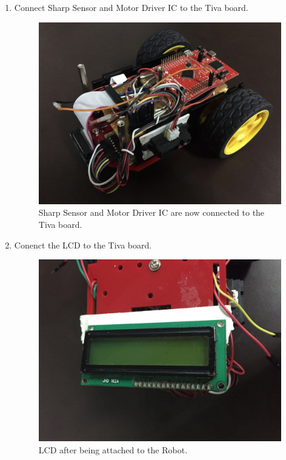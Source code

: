 \documentclass[a4paper,12pt,oneside]{book}
\begin{document}
\begin{enumerate}
\item Connect Sharp Sensor and Motor Driver IC to the Tiva board.
\begin{figure}[h]
        \centering
        \includegraphics[scale=0.16]{all_connected}
        \caption{Sharp Sensor and Motor Driver IC are now connected to the Tiva board.}
      \end{figure}
      \newpage

\item Conenct the LCD to the Tiva board.
\begin{figure}[h]
        \centering
        \includegraphics[scale=0.16]{lcd_a}
        \caption{LCD after being attached to the Robot.}
      \end{figure}


\end{enumerate}
\end{document}
